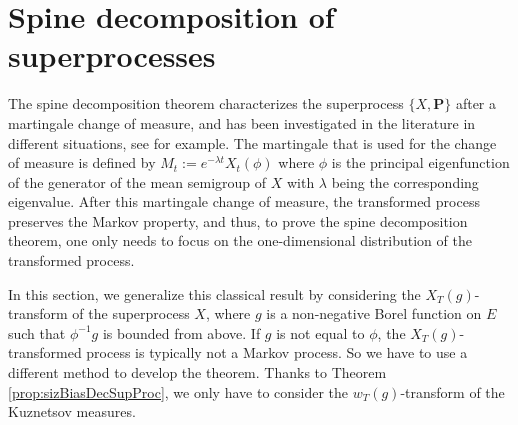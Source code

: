 \section{Spine decomposition of superprocesses}
	The spine decomposition theorem characterizes the superprocess $\{X,\mathbf P\}$ after a martingale change of measure, and has been investigated in the literature in different situations, see \cite{EckhoffKyprianouWinkel2015Spines, EnglanderKyprianou2004Local,  LiuRenSong2009Llog} for example.
	The martingale that is used for the change of measure is defined by $M_t := e^{-\lambda t}X_t(\phi)$ where $\phi$ is the principal eigenfunction of the generator of the mean semigroup of $X$ with $\lambda$ being the corresponding eigenvalue.
	After this martingale change of measure, the transformed process preserves the Markov property, and thus, to prove the spine decomposition theorem, one only needs to focus on the one-dimensional distribution of the transformed process.
\par
	In this section, we generalize this classical result by considering the $X_T(g)$-transform of the superprocess $X$, where $g$ is a non-negative Borel function on $E$ such that $\phi^{-1} g$ is bounded from above.
	If $g$ is not equal to $\phi$, the $X_T(g)$-transformed process is typically not a Markov process.
	So we have to use a different method to develop the theorem.
	Thanks to Theorem \ref{prop:sizBiasDecSupProc},
	we only have to consider the $w_T(g)$-transform of the Kuznetsov measures.

